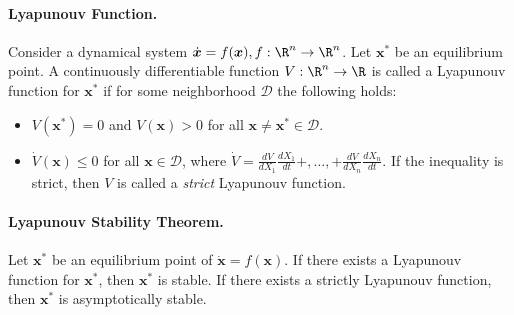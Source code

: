     \paragraph{Lyapunouv Function.}
        Consider a dynamical system $\dot{\bm{x}} = f(\bm{x}), f: \R^n \rightarrow \R^n$.
        Let $\bm{x}^\ast$ be an equilibrium point.
        A continuously differentiable function $V: \R^n \rightarrow \R$ is called a Lyapunouv function for $\bm{x}^\ast$ if for some neighborhood $\mathcal{D}$ the following holds:
            \begin{itemize}
                \item $V(\bm{x}^\ast)=0$ and $V(\bm{x}) > 0$ for all $\bm{x} \ne \bm{x}^\ast \in \mathcal{D}$.
                \item $\dot{V}(\bm{x}) \le 0$ for all $\bm{x} \in \mathcal{D}$, where $\dot{V} = \frac{d V}{dX_1}\frac{d X_1}{d t} + , \ldots , + \frac{d V}{dX_n}\frac{d X_n}{d t}$.
                If the inequality is strict, then $V$ is called a \emph{strict} Lyapunouv function.
            \end{itemize}
            
    \paragraph{Lyapunouv Stability Theorem.}
        Let $\bm{x}^\ast$ be an equilibrium point of $\dot{\bm{x}} = f(\bm{x})$.
        If there exists a Lyapunouv function for $\bm{x}^\ast$, then $\bm{x}^\ast$ is stable. 
        If there exists a strictly Lyapunouv function, then $\bm{x}^\ast$ is asymptotically stable.
        
        